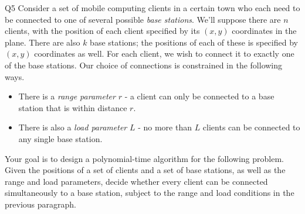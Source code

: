 \begin{problem}
  {Q5}
  Consider a set of mobile computing clients in a certain town who each need to be connected to one of several possible \textit{base stations}.
  We'll suppose there are $n$ clients, with the position of each client specified by its $(x,y)$ coordinates in the plane. There are also $k$ base stations; the positions
  of each of these is specified by $(x,y)$ coordinates as well. For each client, we wish to connect it to exactly one of the base stations. Our
  choice of connections is constrained in the following ways.\\
  \begin{itemize}
  \item There is a \textit{range parameter} $r$ - a client can only be connected to a base station that is within distance $r$.
  \item There is also a \textit{load parameter} $L$ - no more than $L$ clients can be connected to any single base station.
  \end{itemize}
  Your goal is to design a polynomial-time algorithm for the following problem. Given the positions of a set of clients and a set of base stations, as well as the range and load parameters, decide
  whether every client can be connected simultaneously to a base station, subject to the range and load conditions in the previous paragraph.
\end{problem}
